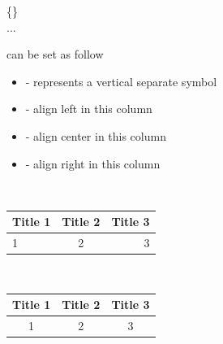 \begin{frame}
	\begin{command}
		\{\}\\
		\qquad ...\\
	\end{command}
	 can be set as follow
	\begin{itemize}
		\item \structure{|} - represents a vertical separate symbol
		\item {} - align left in this column
		\item {} - align center in this column
		\item {} - align right in this column
	\end{itemize}
	\begin{example}
		\begin{minipage}{0.48\linewidth}
			\centering
			\\[0.5em]
        	\begin{tabular}{|l|c|r|}
        		\hline
        		Title 1 & Title 2 & Title 3 \\
        		\hline
        		1 & 2 &3 \\
        		\hline
        	\end{tabular}
		\end{minipage}
		\begin{minipage}{0.48\linewidth}
			\centering
			\\[0.5em]
        	\begin{tabular}{||c|c|c||}
        		\hline
        		Title 1 & Title 2 & Title 3 \\
        		\hline
        		1 & 2 &3 \\
        		\hline
        	\end{tabular}
		\end{minipage}
    \end{example}	
\end{frame}

